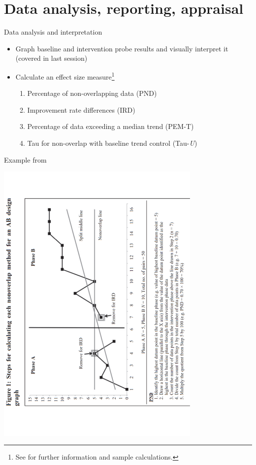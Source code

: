 \documentclass{beamer}
\begin{document}
\section{Data analysis, reporting, appraisal}

% 
\begin{frame}{Data analysis and interpretation}
	\begin{itemize}
	\item Graph baseline and intervention probe results and visually interpret it (covered in last session)
	\item Calculate an effect size measure\footnote{\tiny{See \citet{Rakap2015} for further information and sample calculations.}}
		\begin{enumerate}
		\item Percentage of non-overlapping data (PND)
		\item Improvement rate differences (IRD)
		\item Percentage of data exceeding a median trend (PEM-T)
		\item Tau for non-overlap with baseline trend control (Tau-\emph{U})
		\end{enumerate}
	\end{itemize}
\end{frame}

%
\begin{frame}{Example from \citet{Rakap2015}}
	\begin{center}
	\includegraphics[angle=270, width=10cm]{images/Rakap_Fig1.pdf}
	\end{center}
\end{frame}
\end{document}
